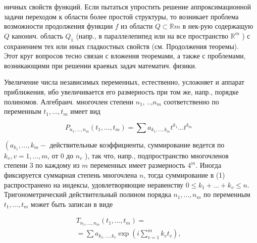 \documentclass[10pt]{article}
\begin{document}
ничных свойств функций. Если пытаться упростить решение аппроксимационной задачи переходом к области более простой структуры, то возникает проблема возможности продолжения функции $f$ из области $Q \subset \mathbb{R} m$ в нек-рую содержащую $Q$ канонич. область $Q_{1}$ (напр., в параллелепипед или на все пространство $\mathbb{R}^{m}$ ) с сохранением тех или иных гладкостных свойств (см. Продолжения теоремы). Этот круг вопросов тесно связан с вложения теоремами, а также с проблемами, возникающими при решении краевых задач математич. физики.



Увеличение числа независимых переменных, естественно, усложняет и аппарат приближения, ибо увеличивается его размерность при том же, напр., порядке полиномов. Алгебраич. многочлен степени $n_{1}$, ..,$n_{m}$ соответственно по переменным $t_{1}, \ldots, t_{m}$ имеет вид



\[

P_{n_{1}, \ldots, n_{m}}\left(t_{1}, \ldots, t_{m}\right)=\sum a_{k_{1}, \ldots, k_{m}} t^{k_{1}} \ldots t^{k_{m}}

\]



$\left(a_{k_{1}}, \ldots, k_{m}-\right.$ действительные коэффициенты, суммирование ведется по $k_{v}, v=1, \ldots, m$, от 0 до $n_{v}$ ), так что, напр., подпространство многочленов степени 3 по каждому из $m$ переменных имеет размерность $4^{m}$. Иногда фиксируется суммарная степень многочлена $n$, тогда суммирование в (1) распространено на индексы, удовлетворяющие неравенству $0 \leqslant k_{1}+\ldots+k_{v} \leqslant n$. Тригонометрический действительный полином порядка $n_{1}, \ldots, n_{m}$ по переменным $t_{1}, \ldots, t_{m}$ может быть записан в виде



\[

\begin{gathered}

T_{n_{1}, \ldots, n_{m}}\left(t_{1}, \ldots, t_{m}\right)= \\

=\sum a_{k_{1}, \ldots, k_{v}} \exp \left(i \sum_{v=1}^{m} k_{v} t_{v}\right),

\end{gathered}

\]
\end{document}
